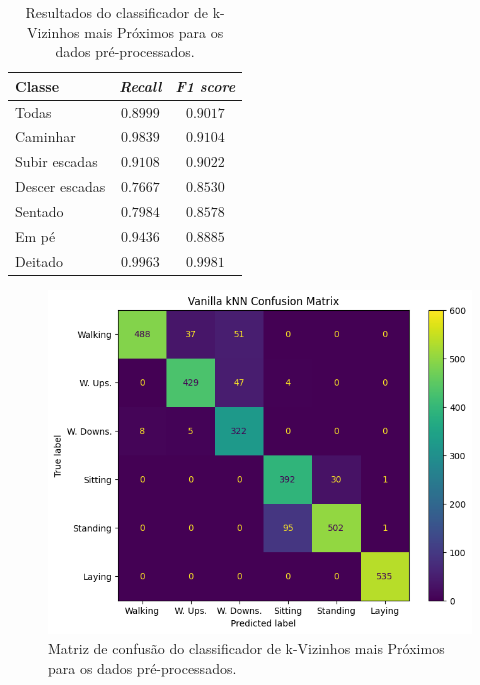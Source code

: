 \documentclass[final,5p]{elsarticle}
\numberwithin{equation}{section}
\begin{document}
        \begin{table}[h]
            \centering
            \begin{tabular}{l c c}
                \toprule
                \textbf{Classe} & \textbf{\emph{Recall}}  & \textbf{\emph{F1 score}} \\
                \midrule
                Todas & $0.8999$ & $0.9017$ \\
                \addlinespace
                Caminhar   & $0.9839$ & $0.9104$ \\
                Subir escadas   & $0.9108$ & $0.9022$ \\
                Descer escadas & $0.7667$ & $0.8530$ \\
                Sentado   & $0.7984$ & $0.8578$ \\
                Em pé  & $0.9436$ & $0.8885$ \\
                Deitado    & $0.9963$ & $0.9981$ \\
                \bottomrule
            \end{tabular}
            \caption{Resultados do classificador de k-Vizinhos mais Próximos para os dados pré-processados.}
            \label{tab:resultados_knn_vanilla_preprocessados}
        \end{table}

        \begin{figure}[hbt!]
            \includegraphics[width=0.95\columnwidth]{A_kNN_Vanilla_CM.png}
            \caption{Matriz de confusão do classificador de k-Vizinhos mais Próximos para os dados pré-processados.}
            \label{fig:cm_knn_vanilla_preprocessados}
        \end{figure}
\end{document}
